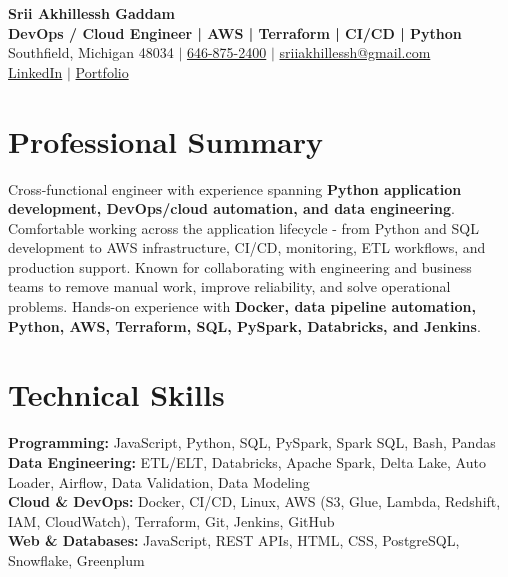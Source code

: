 \documentclass[letterpaper,10pt]{article}
\begin{document}
\fontsize{9.35pt}{10.45pt}\selectfont

\begin{center}
    {\LARGE \textbf{Srii Akhillessh Gaddam}} \\[-1pt]
    \textbf{DevOps / Cloud Engineer | AWS | Terraform | CI/CD | Python} \\[2pt]
    Southfield, Michigan 48034 $|$
    \href{tel:6468752400}{646-875-2400} $|$
    \href{mailto:sriiakhillessh@gmail.com}{sriiakhillessh@gmail.com} \\[1pt]
    \href{https://www.linkedin.com/in/srii-akhiilessh-gaddam-b48668191/}{LinkedIn} $|$
    \href{https://sriiakhillesshg.github.io/portfolio/}{Portfolio}
\end{center}
\vspace{-8pt}

\section{Professional Summary}
\small{Cross-functional engineer with experience spanning \textbf{Python application development, DevOps/cloud automation, and data engineering}. Comfortable working across the application lifecycle - from Python and SQL development to AWS infrastructure, CI/CD, monitoring, ETL workflows, and production support. Known for collaborating with engineering and business teams to remove manual work, improve reliability, and solve operational problems. Hands-on experience with \textbf{Docker, data pipeline automation, Python, AWS, Terraform, SQL, PySpark, Databricks, and Jenkins}.}

\section{Technical Skills}
\small{
\textbf{Programming:} JavaScript, Python, SQL, PySpark, Spark SQL, Bash, Pandas \\
\textbf{Data Engineering:} ETL/ELT, Databricks, Apache Spark, Delta Lake, Auto Loader, Airflow, Data Validation, Data Modeling \\
\textbf{Cloud \& DevOps:} Docker, CI/CD, Linux, AWS (S3, Glue, Lambda, Redshift, IAM, CloudWatch), Terraform, Git, Jenkins, GitHub \\
\textbf{Web \& Databases:} JavaScript, REST APIs, HTML, CSS, PostgreSQL, Snowflake, Greenplum
}
\end{document}
